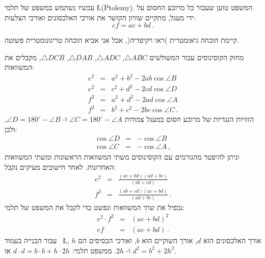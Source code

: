 \documentclass[12pt,a4paper]{article}
\begin{document}
עכשיו נשתמש במשפט של תלמי
\L{(Ptolemy)}.
המשפט טוען שעבור כל מרובע החסום על ידי מעגל, מתקיים שוויון הקושר את אורכי האלכסונים ואורכי הצלעות: 
\[
ef = ac + bd\,.
\]
\begin{center}
\vspace*{-28pt}
\vspace*{-12pt}
\end{center}
קיימת הוכחה גיאומטרית )ראו ויקיפדיה(, אבל אני אביא הוכחה טריגונומטרית פשוטה.

מחוק הקוסינוסים עבור המשולשים
$\triangle ABC$, $\triangle ADC$, $\triangle DAB$, $\triangle DCB$,
מקבלים את המשוואות:
\begin{eqnarray*}
e^2 &=& a^2 + b^2 - 2ab \cos \angle B\\
e^2 &=& c^2 + d^2 - 2cd \cos \angle D\\
f^2 &=& a^2 + d^2 - 2ad \cos \angle A\\
f^2 &=& b^2 + c^2 - 2bc \cos \angle C\,.
\end{eqnarray*}
הזוויות הנגדיות של מרובע חסום במעגל צמודות
$\angle C = 180^\circ - \angle A$
ו-%
$\angle D = 180^\circ - \angle B$,
ולכן:
\begin{eqnarray*}
\cos \angle D &=& - \cos \angle B\\
\cos \angle C &=& -\cos \angle A\,,
\end{eqnarray*}
וניתן להיפטר מהגורמים עם הקוסינוסים משתי המשוואות הראשונות ומשתי המשוואות האחרונות. לאחר חישובים מעיקים נקבל:
\begin{eqnarray*}
e^2 &=& \frac{(ac+bd)(ad+bc)}{(ab+cd)}\\
f^2 &=& \frac{(ab+cd)(ac+bd)}{(ad+bc)}\,.
\end{eqnarray*}
נכפיל את שתי המשוואות ונפשט כדי לקבל את המשפט של תלמי:
\begin{eqnarray*}
e^2\cdot f^2 &=& (ac+bd)^2\\
ef &=& (ac+bd)\,. 
\end{eqnarray*}
עבור הבנייה בעמוד~%
\L{\pageref{p.ptolemy}},
אורך האלכסונים הוא
$d$,
אורך השוקיים הוא
$b$,
ואורכי הבסיסים הם
$h$
ו-%
$2h$.
ממשפט תלמי:
$d\cdot d = b\cdot b + h\cdot 2h$
או
$d^2=b^2+2h^2$.
\end{document}
